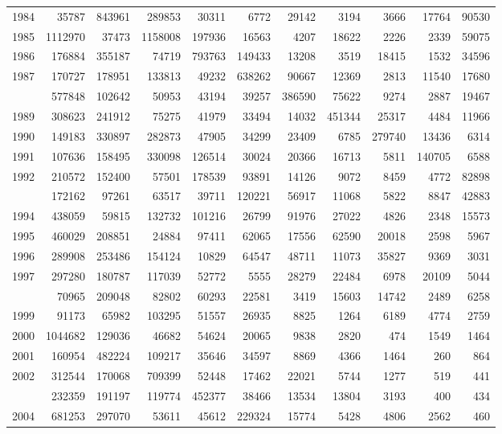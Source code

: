 \documentclass[
]{article}
\begin{document}
\begin{longtable}[t]{lrrrrrrrrrr}
1984 & 35787 & 843961 & 289853 & 30311 & 6772 & 29142 & 3194 & 3666 & 17764 & 90530\\
1985 & 1112970 & 37473 & 1158008 & 197936 & 16563 & 4207 & 18622 & 2226 & 2339 & 59075\\
1986 & 176884 & 355187 & 74719 & 793763 & 149433 & 13208 & 3519 & 18415 & 1532 & 34596\\
1987 & 170727 & 178951 & 133813 & 49232 & 638262 & 90667 & 12369 & 2813 & 11540 & 17680\\
\addlinespace
1988 & 577848 & 102642 & 50953 & 43194 & 39257 & 386590 & 75622 & 9274 & 2887 & 19467\\
1989 & 308623 & 241912 & 75275 & 41979 & 33494 & 14032 & 451344 & 25317 & 4484 & 11966\\
1990 & 149183 & 330897 & 282873 & 47905 & 34299 & 23409 & 6785 & 279740 & 13436 & 6314\\
1991 & 107636 & 158495 & 330098 & 126514 & 30024 & 20366 & 16713 & 5811 & 140705 & 6588\\
1992 & 210572 & 152400 & 57501 & 178539 & 93891 & 14126 & 9072 & 8459 & 4772 & 82898\\
\addlinespace
1993 & 172162 & 97261 & 63517 & 39711 & 120221 & 56917 & 11068 & 5822 & 8847 & 42883\\
1994 & 438059 & 59815 & 132732 & 101216 & 26799 & 91976 & 27022 & 4826 & 2348 & 15573\\
1995 & 460029 & 208851 & 24884 & 97411 & 62065 & 17556 & 62590 & 20018 & 2598 & 5967\\
1996 & 289908 & 253486 & 154124 & 10829 & 64547 & 48711 & 11073 & 35827 & 9369 & 3031\\
1997 & 297280 & 180787 & 117039 & 52772 & 5555 & 28279 & 22484 & 6978 & 20109 & 5044\\
\addlinespace
1998 & 70965 & 209048 & 82802 & 60293 & 22581 & 3419 & 15603 & 14742 & 2489 & 6258\\
1999 & 91173 & 65982 & 103295 & 51557 & 26935 & 8825 & 1264 & 6189 & 4774 & 2759\\
2000 & 1044682 & 129036 & 46682 & 54624 & 20065 & 9838 & 2820 & 474 & 1549 & 1464\\
2001 & 160954 & 482224 & 109217 & 35646 & 34597 & 8869 & 4366 & 1464 & 260 & 864\\
2002 & 312544 & 170068 & 709399 & 52448 & 17462 & 22021 & 5744 & 1277 & 519 & 441\\
\addlinespace
2003 & 232359 & 191197 & 119774 & 452377 & 38466 & 13534 & 13804 & 3193 & 400 & 434\\
2004 & 681253 & 297070 & 53611 & 45612 & 229324 & 15774 & 5428 & 4806 & 2562 & 460\\

\end{longtable}
\end{document}
